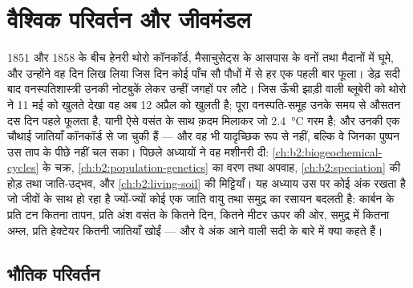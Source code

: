 \chapter{वैश्विक परिवर्तन और जीवमंडल}\label{ch:b2:global-change}

1851 और 1858 के बीच हेनरी थोरो कॉनकॉर्ड, मैसाचुसेट्स के आसपास के
वनों तथा मैदानों में घूमे, और उन्होंने वह दिन लिख लिया जिस दिन कोई
पाँच सौ पौधों में से हर एक पहली बार फूला। डेढ़ सदी बाद
वनस्पतिशास्त्री उनकी नोटबुकें लेकर उन्हीं जगहों पर लौटे। जिस
ऊँची झाड़ी वाली ब्लूबेरी को थोरो ने 11 मई को खुलते देखा वह अब
12 अप्रैल को खुलती है; पूरा वनस्पति-समूह उनके समय से औसतन दस दिन पहले
फूलता है, यानी ऐसे वसंत के साथ क़दम मिलाकर जो \qty{2.4}{\celsius}
गरम है; और उनकी एक चौथाई जातियाँ कॉनकॉर्ड से जा चुकी हैं --- और वह भी
यादृच्छिक रूप से नहीं, बल्कि वे जिनका पुष्पन उस
ताप के पीछे नहीं चल सका। पिछले अध्यायों ने वह मशीनरी दी:
\cref{ch:b2:biogeochemical-cycles} के चक्र,
\cref{ch:b2:population-genetics} का वरण तथा अपवाह,
\cref{ch:b2:speciation} की होड़ तथा जाति-उद्भव, और \cref{ch:b2:living-soil} की मिट्टियाँ।
यह अध्याय उस पर कोई अंक रखता है जो जीवों के साथ हो रहा है
ज्यों-ज्यों कोई एक जाति वायु तथा समुद्र का रसायन बदलती है: कार्बन के प्रति टन
कितना तापन, प्रति अंश वसंत के कितने दिन, कितने मीटर ऊपर की ओर,
समुद्र में कितना अम्ल, प्रति हेक्टेयर कितनी
जातियाँ खोईं --- और वे अंक आने वाली सदी के बारे में
क्या कहते हैं।

\section{भौतिक परिवर्तन}

